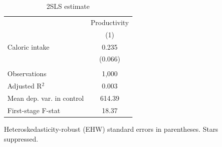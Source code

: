 
\begin{table}[htbp]
   \caption{\label{tab:iv} 2SLS estimate}
   \bigskip
   \centering
   \begin{tabular}{lc}
      \toprule
                                & Productivity \\   
                                & (1)\\  
      \midrule 
      Caloric intake            & 0.235\\   
                                & (0.066)\\   
       \\
      Observations              & 1,000\\  
      Adjusted R$^2$            & 0.003\\  
      Mean dep. var. in control & 614.39\\  
      First-stage F-stat        & 18.37\\  
      \bottomrule
   \end{tabular}
   
   \par \raggedright 
   Heteroskedasticity-robust (EHW) standard errors in parentheses. Stars suppressed.
\end{table}



